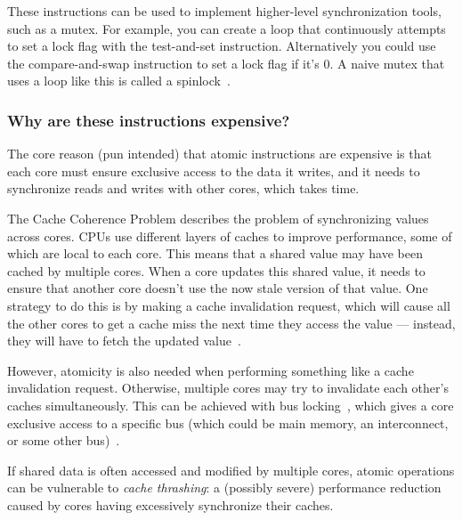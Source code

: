 These instructions can be used to implement higher-level synchronization tools, such as a mutex. For example, you can create a loop that continuously attempts to set a lock flag with the test-and-set instruction. Alternatively you could use the compare-and-swap instruction to set a lock flag if it's 0. A naive mutex that uses a loop like this is called a spinlock~\cite[slide 64]{concurrencyslides}.

\subsubsection{Why are these instructions expensive?}

The core reason (pun intended) that atomic instructions are expensive is that each core must ensure exclusive access to the data it writes, and it needs to synchronize reads and writes with other cores, which takes time.

The Cache Coherence Problem describes the problem of synchronizing values across cores. CPUs use different layers of caches to improve performance, some of which are local to each core. This means that a shared value may have been cached by multiple cores. When a core updates this shared value, it needs to ensure that another core doesn't use the now stale version of that value. One strategy to do this is by making a cache invalidation request, which will cause all the other cores to get a cache miss the next time they access the value --- instead, they will have to fetch the updated value~\cite[slide 44-54]{concurrencyslides}.

However, atomicity is also needed when performing something like a cache invalidation request. Otherwise, multiple cores may try to invalidate each other's caches simultaneously. This can be achieved with bus locking~\cite[slide 55]{concurrencyslides}, which gives a core exclusive access to a specific bus (which could be main memory, an interconnect, or some other bus)~\cite[slide 55]{concurrencyslides}.

If shared data is often accessed and modified by multiple cores, atomic operations can be vulnerable to \textit{cache thrashing}: a (possibly severe) performance reduction caused by cores having excessively synchronize their caches.
